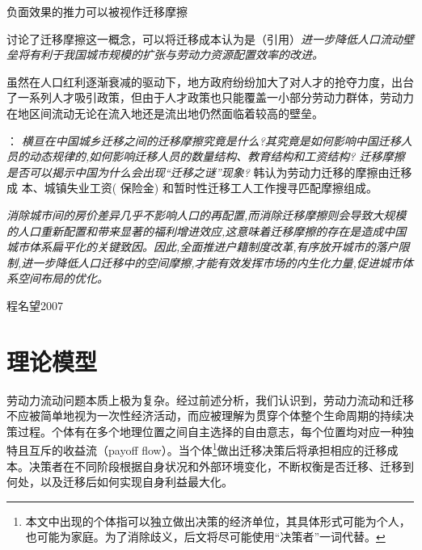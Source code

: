 \documentclass[a4paper,12pt,oneside]{book} %
\begin{document}
负面效果的推力可以被视作迁移摩擦

\cite{WangLiLiWoGuoRenKouQianYiChengBenChengShiGuiMoYuShengChanLu2020}讨论了迁移摩擦这一概念，可以将迁移成本认为是（引用）\textit{进一步降低人口流动壁垒将有利于我国城市规模的扩张与劳动力资源配置效率的改进。}

虽然在人口红利逐渐衰减的驱动下，地方政府纷纷加大了对人才的抢夺力度，出台了一系列人才吸引政策，但由于人才政策也只能覆盖一小部分劳动力群体，劳动力在地区间流动无论在流入地还是流出地仍然面临着较高的壁垒。

\cite{HanQiHengNongCunLaoDongLiQianYiMoCaYingXiangNongMinGongShuLiangYuGongZiJieGouMa2018}：
\textit{横亘在中国城乡迁移之间的迁移摩擦究竟是什么?其究竟是如何影响中国迁移人员的动态规律的,如何影响迁移人员的数量结构、教育结构和工资结构? 迁移摩擦是否可以揭示中国为什么会出现“迁移之谜”现象?}
韩认为劳动力迁移的摩擦由迁移成 本、城镇失业工资( 保险金) 和暂时性迁移工人工作搜寻匹配摩擦组成。

\cite{LiuXiuYanFangJieQianYiMoCaYuZhongGuoChengShiDeGuiMoFenBuLiLunMoXingYuJieGouShiGuJi2017}
\textit{消除城市间的房价差异几乎不影响人口的再配置,而消除迁移摩擦则会导致大规模的人口重新配置和带来显著的福利增进效应,这意味着迁移摩擦的存在是造成中国城市体系扁平化的关键致因。因此,全面推进户籍制度改革,有序放开城市的落户限制,进一步降低人口迁移中的空间摩擦,才能有效发挥市场的内生化力量,促进城市体系空间布局的优化。}


程名望2007






































\chapter{理论模型}

劳动力流动问题本质上极为复杂。经过前述分析，我们认识到，劳动力流动和迁移不应被简单地视为一次性经济活动，而应被理解为贯穿个体整个生命周期的持续决策过程。个体有在多个地理位置之间自主选择的自由意志，每个位置均对应一种独特且互斥的收益流（payoff flow）。当个体\footnote{本文中出现的个体指可以独立做出决策的经济单位，其具体形式可能为个人，也可能为家庭。为了消除歧义，后文将尽可能使用“决策者”一词代替。}做出迁移决策后将承担相应的迁移成本。决策者在不同阶段根据自身状况和外部环境变化，不断权衡是否迁移、迁移到何处，以及迁移后如何实现自身利益最大化。
\end{document}
